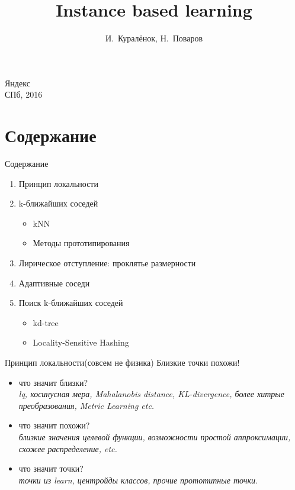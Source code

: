 \documentclass[14pt, fleqn, xcolor={dvipsnames, table}]{beamer}
\title{Instance based learning\\\small{}}
\author[]{\small{%
И.~Куралёнок,
Н.~Поваров}}
\date{}
\begin{document}
\begin{frame}
\maketitle
\small
\begin{center}
\vspace{-60pt}
\normalsize {\color{red}Я}ндекс \\
\vspace{80pt}
\footnotesize СПб, 2016
\end{center}
\end{frame}

\section{Содержание}
\begin{frame}{Содержание}
\begin{enumerate}
  \item Принцип локальности
  \item k-ближайших соседей
  \begin{itemize}
    \item kNN
    \item Методы прототипирования
  \end{itemize}
  \item Лирическое отступление: проклятье размерности
  \item Адаптивные соседи
  \item Поиск k-ближайших соседей
  \begin{itemize}
    \item kd-tree
    \item Locality-Sensitive Hashing
  \end{itemize}
\end{enumerate}
\end{frame}

\begin{frame}{Принцип локальности(совсем не физика)}
  Близкие точки похожи!
  \begin{itemize}
    \item что значит близки? \\
    \emph{lq, косинусная мера, Mahalanobis distance, KL-divergence, более хитрые преобразования, Metric Learning etc.}
    \item что значит похожи? \\
    \emph{близкие значения целевой функции, возможности простой аппроксимации, схожее распределение, etc.}
    \item что значит точки? \\
    \emph{точки из learn, центройды классов, прочие прототипные точки.}
  \end{itemize}
\end{frame}
\end{document}
